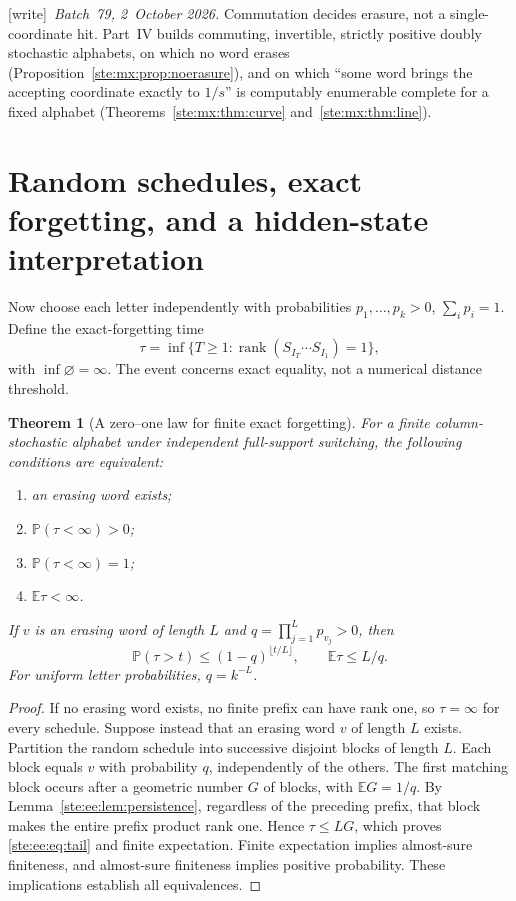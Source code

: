 \documentclass[11pt,letterpaper]{article}
\newtheorem{theorem}{Theorem}[section]
\theoremstyle{definition}
\theoremstyle{remark}
\newcommand{\rk}{\operatorname{rank}}
\newcommand{\EE}{\mathbb E}
\newcommand{\PP}{\mathbb P}
\newcommand{\wtag}{\textup{[write]}}
\begin{document}
\wtag\ \emph{Batch~79, 2~October 2026.} Commutation decides erasure, not a single-coordinate hit. Part~IV builds commuting, invertible, strictly positive doubly stochastic alphabets, on which no word erases (Proposition~\ref{ste:mx:prop:noerasure}), and on which ``some word brings the accepting coordinate exactly to $1/s$'' is computably enumerable complete for a fixed alphabet (Theorems~\ref{ste:mx:thm:curve} and~\ref{ste:mx:thm:line}).

\section{Random schedules, exact forgetting, and a hidden-state interpretation}
\label{ste:ee:sec:random}

Now choose each letter independently with probabilities
$p_1,\ldots,p_k>0$, $\sum_i p_i=1$. Define the exact-forgetting time
\[
 \tau=\inf\{T\geq1:\rk(S_{I_T}\cdots S_{I_1})=1\},
\]
with $\inf\varnothing=\infty$. The event concerns exact equality, not a
numerical distance threshold.

\begin{theorem}[A zero--one law for finite exact forgetting]\label{ste:ee:thm:iid}
For a finite column-stochastic alphabet under independent full-support
switching, the following conditions are equivalent:
\begin{enumerate}[label=(\roman*)]
\item an erasing word exists;
\item $\PP(\tau<\infty)>0$;
\item $\PP(\tau<\infty)=1$;
\item $\EE\tau<\infty$.
\end{enumerate}
If $v$ is an erasing word of length $L$ and
$q=\prod_{j=1}^L p_{v_j}>0$, then
\begin{equation}
 \PP(\tau>t)\leq(1-q)^{\lfloor t/L\rfloor},\qquad
 \EE\tau\leq L/q.
 \label{ste:ee:eq:tail}
\end{equation}
For uniform letter probabilities, $q=k^{-L}$.
\end{theorem}
\begin{proof}
If no erasing word exists, no finite prefix can have rank one, so $\tau=\infty$
for every schedule. Suppose instead that an erasing word $v$ of length $L$
exists. Partition the random schedule into successive disjoint blocks of length
$L$. Each block equals $v$ with probability $q$, independently of the others.
The first matching block occurs after a geometric number $G$ of blocks, with
$\EE G=1/q$. By Lemma~\ref{ste:ee:lem:persistence}, regardless of the preceding prefix,
that block makes the entire prefix product rank one. Hence $\tau\leq LG$, which
proves \eqref{ste:ee:eq:tail} and finite expectation. Finite expectation implies
almost-sure finiteness, and almost-sure finiteness implies positive probability.
These implications establish all equivalences.
\end{proof}
\end{document}
